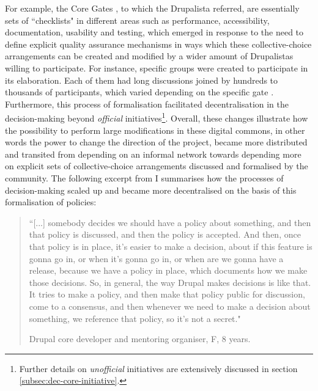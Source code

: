 For example, the Core Gates \parencite{drupalorg-core-gates:2015:Online, drupalorg-core-gates-rfc:2015:Online}, to which the Drupalista referred, are essentially sets of ``checklists" in different areas such as performance, accessibility, documentation, usability and testing, which emerged in response to the need to define explicit quality assurance mechanisms in ways which these collective-choice arrangements can be created and modified by a wider amount of Drupalistas willing to participate. For instance, specific groups were created to participate in its elaboration. Each of them had long discussions joined by hundreds to thousands of participants, which varied depending on the specific gate \parencite{drupalorg-core-gates-testing:2015:Online, drupalorg-core-gates-performance:2015:Online, drupalorg-core-gates-accesiblity:2015:Online}. Furthermore, this process of formalisation facilitated decentralisation in the decision-making beyond \textit{official} initiatives\footnote{Further details on \textit{unofficial} initiatives are extensively discussed in section \ref{subsec:dec-core-initiative}.}. Overall, these changes illustrate how the possibility to perform large modifications in these digital commons, in other words the power to change the direction of the project, became more distributed and transited from depending on an informal network towards depending more on explicit sets of collective-choice arrangements discussed and formalised by the community. The following excerpt from I summarises how the processes of decision-making scaled up and became more decentralised on the basis of this formalisation of policies:

\begin{quotation}
``[...] somebody decides we should have a policy about something, and then that policy is discussed, and then the policy is accepted. And then, once that policy is in place, it's easier to make a decision, about if this feature is gonna go in, or when it's gonna go in, or when are we gonna have a release, because we have a policy in place, which documents how we make those decisions. So, in general, the way Drupal makes decisions is like that. It tries to make a policy, and then make that policy public for discussion, come to a consensus, and then whenever we need to make a decision about something, we reference that policy, so it's not a secret."

\begin{flushright}\footnotesize{Drupal core developer and mentoring organiser, F, 8 years.}\end{flushright}
\end{quotation}

